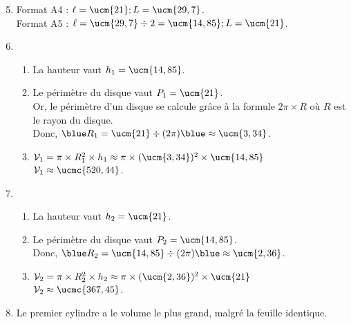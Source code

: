 \begin{enumerate}
   \setcounter{enumi}{4}
      \item Format A4 : {\blue $\ell =\ucm{21}; L=\ucm{29,7}$}. \\
         Format A5 : {\blue $\ell =\ucm{29,7}\div2 = \ucm{14,85}; L=\ucm{21}$}.
      \item
      \begin{enumerate}
         \item La hauteur vaut {\blue $h_1 =\ucm{14,85}$}.
         \item Le périmètre du disque vaut {\blue $P_1 =\ucm{21}$}. \\
         Or, le périmètre d'un disque se calcule grâce à la formule $2\pi\times R$ où $R$ est le rayon du disque. \\
            Donc,  ${\blue R_1} =\ucm{21}\div(2\pi) {\blue \approx\ucm{3,34}}$.
         \item $\mathcal{V}_1 =\pi\times R_1^2\times h_1 \approx\pi\times(\ucm{3,34})^2\times\ucm{14,85}$ \\
            {\blue $\mathcal{V}_1 \approx\ucmc{520,44}$}.
      \end{enumerate}
      \setcounter{enumi}{6}
      \item
      \begin{enumerate}
         \item La hauteur vaut {\blue $h_2 =\ucm{21}$}.
         \item Le périmètre du disque vaut {\blue $P_2 =\ucm{14,85}$}. \\
            Donc,  ${\blue R_2} =\ucm{14,85}\div(2\pi) {\blue \approx\ucm{2,36}}$.
         \item $\mathcal{V}_2 =\pi\times R_2^2\times h_2 \approx\pi\times(\ucm{2,36})^2\times\ucm{21}$ \\
            {\blue $\mathcal{V}_2 \approx\ucmc{367,45}$}.
      \end{enumerate}
      \setcounter{enumi}{7}
      \item {\blue Le premier cylindre a le volume le plus grand}, malgré la feuille identique.
   \end{enumerate}
